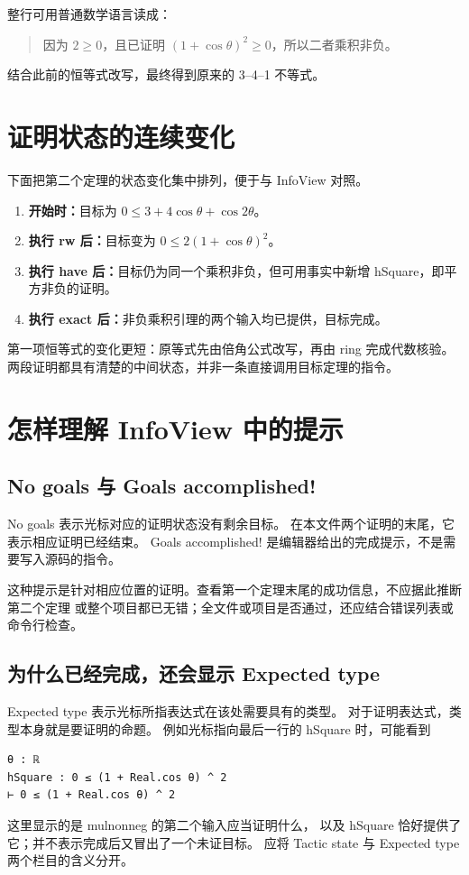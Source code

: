 \documentclass[UTF8,fontset=fandol,a4paper,11pt]{ctexart}
\newcommand{\code}[1]{{\small\ttfamily\def\_{\textunderscore\allowbreak}#1}}
\newcommand{\step}[1]{\Needspace{7\baselineskip}\subsection{#1}}
\begin{document}
整行可用普通数学语言读成：
\begin{quote}
因为 $2\ge0$，且已证明 $(1+\cos\theta)^2\ge0$，所以二者乘积非负。
\end{quote}
结合此前的恒等式改写，最终得到原来的 3–4–1 不等式。

\section{证明状态的连续变化}

下面把第二个定理的状态变化集中排列，便于与 InfoView 对照。
\begin{enumerate}
  \item \textbf{开始时：}目标为 $0\le3+4\cos\theta+\cos2\theta$。
  \item \textbf{执行 \code{rw} 后：}目标变为 $0\le2(1+\cos\theta)^2$。
  \item \textbf{执行 \code{have} 后：}目标仍为同一个乘积非负，但可用事实中新增
    \code{hSquare}，即平方非负的证明。
  \item \textbf{执行 \code{exact} 后：}非负乘积引理的两个输入均已提供，目标完成。
\end{enumerate}
第一项恒等式的变化更短：原等式先由倍角公式改写，再由 \code{ring} 完成代数核验。
两段证明都具有清楚的中间状态，并非一条直接调用目标定理的指令。

\section{怎样理解 InfoView 中的提示}

\step{\code{No goals} 与 \code{Goals accomplished!}}
\code{No goals} 表示光标对应的证明状态没有剩余目标。
在本文件两个证明的末尾，它表示相应证明已经结束。
\code{Goals accomplished!} 是编辑器给出的完成提示，不是需要写入源码的指令。

这种提示是针对相应位置的证明。查看第一个定理末尾的成功信息，不应据此推断第二个定理
或整个项目都已无错；全文件或项目是否通过，还应结合错误列表或命令行检查。

\step{为什么已经完成，还会显示 \code{Expected type}}
\code{Expected type} 表示光标所指表达式在该处需要具有的类型。
对于证明表达式，类型本身就是要证明的命题。
例如光标指向最后一行的 \code{hSquare} 时，可能看到
\begin{Verbatim}
θ : ℝ
hSquare : 0 ≤ (1 + Real.cos θ) ^ 2
⊢ 0 ≤ (1 + Real.cos θ) ^ 2
\end{Verbatim}
这里显示的是 \code{mul\_nonneg} 的第二个输入应当证明什么，
以及 \code{hSquare} 恰好提供了它；并不表示完成后又冒出了一个未证目标。
应将 \code{Tactic state} 与 \code{Expected type} 两个栏目的含义分开。
\end{document}
